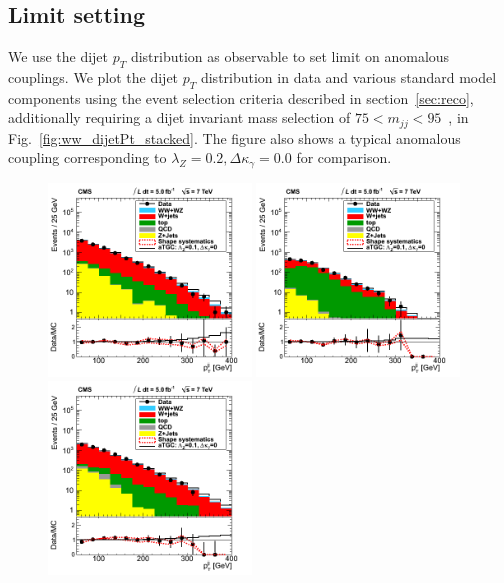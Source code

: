 \subsection{Limit setting}
\label{sec:limits}
We use the dijet $p_T$ distribution as observable to set limit on anomalous couplings. 
We plot the dijet $p_T$ distribution in data and various standard model 
components using the event selection criteria described in section~\ref{sec:reco},
additionally requiring a dijet invariant mass selection of $75 < m_{jj} < 95$~\GeV,
in Fig.~\ref{fig:ww_dijetPt_stacked}. 
The figure also shows a typical anomalous coupling corresponding to 
$\lambda_Z = 0.2, \Delta{\kappa_\gamma} = 0.0$ for comparison.
\begin{figure}[h!t]
  {\centering
    \includegraphics[width=0.48\textwidth]{figs/mu_noBtag_dijetPt.png}
    \includegraphics[width=0.48\textwidth]{figs/mu_btag_dijetPt.png}
    \includegraphics[width=0.48\textwidth]{figs/el_noBtag_dijetPt.png}
}
\end{figure}
